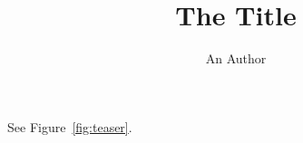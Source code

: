 \documentclass[twocolumn]{article}
\title{The Title}\author{An Author}
\begin{document}
\let\oldtwocolumn\twocolumn
\renewcommand\twocolumn[1][]{\oldtwocolumn[{#1}{\begin{center}\rule{1cm}{1cm}
  \captionof{figure}{The teaser.}\label{fig:teaser}\end{center}}]}
\maketitle
See Figure~\ref{fig:teaser}.
\end{document}
